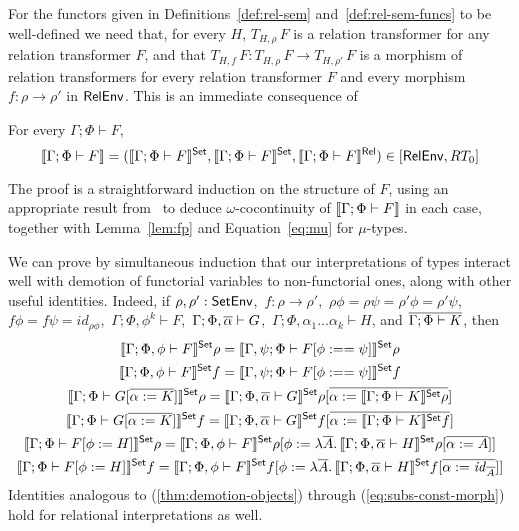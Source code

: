 \documentclass{lmcs}
\theoremstyle{plain}\newtheorem{satz}[thm]{Satz}
\renewcommand{\id}{\mathit{id}}
\begin{document}
For the functors given in Definitions~\ref{def:rel-sem}
and~\ref{def:rel-sem-funcs} to be well-defined we need that, for every
$H$, $T_{H,\rho}\,F$ is a relation transformer for any relation
transformer $F$, and that $T_{H,f}\, F : T_{H,\rho}\, F \to
T_{H,\rho'}\, F$ is a morphism of relation transformers for every
relation transformer $F$ and every morphism $f : \rho \to \rho'$ in
$\mathsf{RelEnv}$. This is an immediate consequence of
\begin{lem}\label{lem:rel-transf-morph}
For every $\Gamma;\Phi \vdash F$,
\[\llbracket{\Gamma;\Phi \vdash F}\rrbracket = (\llbracket{\Gamma;\Phi \vdash F}\rrbracket^{\mathsf{Set}},
\llbracket{\Gamma;\Phi \vdash F}\rrbracket^{\mathsf{Set}},\llbracket{\Gamma;\Phi \vdash F}\rrbracket^{\mathsf{Rel}})
\in[\mathsf{RelEnv},RT_0]\] 
\end{lem}
\noindent
The proof is a straightforward induction on the structure of $F$,
using an appropriate result from~\cite{jp19} to deduce
$\omega$-cocontinuity of $\llbracket{\Gamma;\Phi \vdash F}\rrbracket$ in each case,
together with Lemma~\ref{lem:fp} and Equation~\ref{eq:mu} for
$\mu$-types.

We can prove by simultaneous induction that our interpretations of
types interact well with demotion of functorial variables to
non-functorial ones, along with other useful identities. Indeed, if
$\rho, \rho' : \mathsf{SetEnv}$, \,$f : \rho \to \rho'$, \,$\rho \phi = \rho
\psi = \rho' \phi = \rho' \psi$, \, $f \phi = f \psi = \id_{\rho
  \phi}$,\, $\Gamma; \Phi, \phi^k \vdash F$,\,
$\Gamma;\Phi,\overline{\alpha} \vdash G$,\, $\Gamma;\Phi,\alpha_1...\alpha_k
\vdash H$, and $\overline{\Gamma;\Phi \vdash K}$, then
\begin{gather}
\label{thm:demotion-objects}
\setsem{\Gamma; \Phi, \phi \vdash F} \rho = \setsem{\Gamma, \psi; \Phi
  \vdash F[\phi :== \psi] } \rho\\
\label{thm:demotion-morphisms}
\setsem{\Gamma; \Phi, \phi \vdash F} f = \setsem{\Gamma, \psi; \Phi
  \vdash F[\phi :== \psi]} f\\
\label{eq:subs-var}
\setsem{\Gamma;\Phi \vdash G[\ol{\alpha := K}]}\rho =
\setsem{\Gamma;\Phi,\ol{\alpha} \vdash G}\rho[\ol{\alpha := 
\setsem{\Gamma;\Phi \vdash K}\rho}]\\
\label{eq:subs-var-morph}
\setsem{\Gamma;\Phi \vdash G[\ol{\alpha := K}]}f =
\setsem{\Gamma;\Phi,\ol{\alpha} \vdash G}f[\ol{\alpha :=
\setsem{\Gamma;\Phi \vdash K}f}]\\
\label{eq:subs-const}
\setsem{\Gamma; \Phi \vdash F[\phi := H]}\rho
= \setsem{\Gamma; \Phi, \phi \vdash F}\rho
[\phi := \lambda \ol{A}.\, \setsem{\Gamma;\Phi,\overline{\alpha}\vdash
    H}\rho[\overline{\alpha := A}]] \\ 
\label{eq:subs-const-morph}
\setsem{\Gamma; \Phi \vdash F[\phi := H]}f
= \setsem{\Gamma; \Phi, \phi \vdash F}f
[\phi := \lambda \ol{A}.\,\setsem{\Gamma;\Phi,\overline{\alpha}\vdash
    H}f[\overline{\alpha := \id_{\ol{A}}}]] 
\end{gather}
Identities analogous to (\ref{thm:demotion-objects}) through
(\ref{eq:subs-const-morph}) hold for relational interpretations as well.
\end{document}
